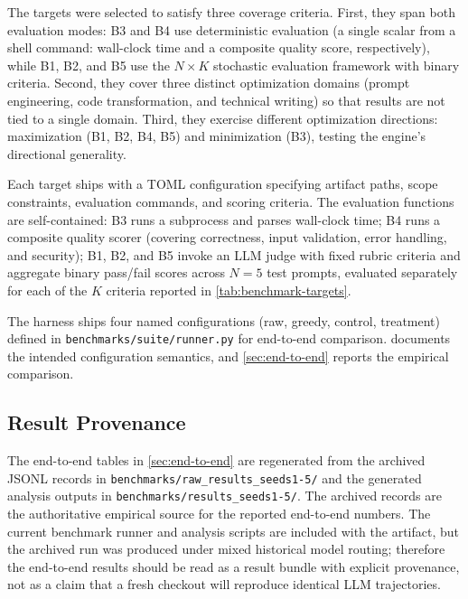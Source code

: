The targets were selected to satisfy three coverage criteria.
First, they span both evaluation modes: B3 and B4 use deterministic evaluation (a single scalar from a shell command: wall-clock time and a composite quality score, respectively), while B1, B2, and B5 use the $N \times K$ stochastic evaluation framework with binary criteria.
Second, they cover three distinct optimization domains (prompt engineering, code transformation, and technical writing) so that results are not tied to a single domain.
Third, they exercise different optimization directions: maximization (B1, B2, B4, B5) and minimization (B3), testing the engine's directional generality.

Each target ships with a TOML configuration specifying artifact paths, scope constraints, evaluation commands, and scoring criteria.
The evaluation functions are self-contained: B3 runs a subprocess and parses wall-clock time; B4 runs a composite quality scorer (covering correctness, input validation, error handling, and security); B1, B2, and B5 invoke an LLM judge with fixed rubric criteria and aggregate binary pass/fail scores across $N = 5$ test prompts, evaluated separately for each of the $K$ criteria reported in \cref{tab:benchmark-targets}.

The harness ships four named configurations (raw, greedy, control, treatment) defined in \texttt{benchmarks/suite/runner.py} for end-to-end comparison.
 documents the intended configuration semantics, and \cref{sec:end-to-end} reports the empirical comparison.

\subsection{Result Provenance}
\label{sec:result-provenance}

The end-to-end tables in \cref{sec:end-to-end} are regenerated from the archived JSONL records in \texttt{benchmarks/raw\_results\_seeds1-5/} and the generated analysis outputs in \texttt{benchmarks/results\_seeds1-5/}.
The archived records are the authoritative empirical source for the reported end-to-end numbers.
The current benchmark runner and analysis scripts are included with the artifact, but the archived run was produced under mixed historical model routing; therefore the end-to-end results should be read as a result bundle with explicit provenance, not as a claim that a fresh checkout will reproduce identical LLM trajectories.

